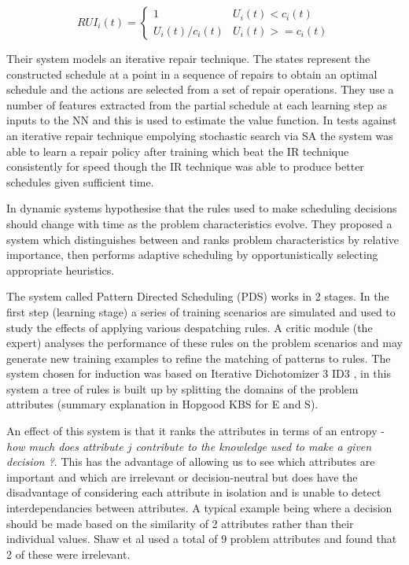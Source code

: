 \begin{equation}
RUI_i(t) = 
\begin{cases}
1& \text{$U_i(t) < c_i(t)$} \\
U_i(t)/c_i(t)& \text{$U_i(t) >= c_i(t)$}
\end{cases}
\end{equation}


Their system models an iterative repair technique. The states represent the constructed schedule at a point in a sequence of repairs to obtain an optimal schedule and the actions are selected from a set of repair operations. They use a number of features extracted from the partial schedule at each learning step as inputs to the NN and this is used to estimate the value function. In tests against an iterative repair technique empolying stochastic search via SA \cite{zweben94scheduling} the system was able to learn a repair policy after training which beat the IR technique consistently for speed though the IR technique was able to produce better schedules given sufficient time.


In dynamic systems \cite{shaw90intelligent} hypothesise that the rules used to make scheduling decisions should change with time as the problem characteristics evolve. They proposed a system which distinguishes between and ranks problem characteristics by relative importance, then performs adaptive scheduling by opportunistically selecting appropriate heuristics. 

The system called Pattern Directed Scheduling (PDS) works in 2 stages. In the first step (learning stage) a series of training scenarios are simulated and used to study the effects of applying various despatching rules. A critic module (the expert) analyses the performance of these rules on the problem scenarios and may generate new training examples to refine the matching of patterns to rules. The system chosen for induction was based on Iterative Dichotomizer 3 ID3 \cite{quinlan86induction}, in this system a tree of rules is built up by splitting the domains of the problem attributes (summary explanation in Hopgood KBS for E and S). 

An effect of this system is that it ranks the attributes in terms of an entropy - \emph{how much does attribute $j$ contribute to the knowledge used to make a given decision ?}. This has the advantage of allowing us to see which attributes are important and which are irrelevant or decision-neutral but does have the disadvantage of considering each attribute in isolation and is unable to detect interdependancies between attributes. A typical example being where a decision should be made based on the similarity of 2 attributes rather than their individual values. Shaw et al used a total of 9 problem attributes and found that 2 of these were irrelevant. 

